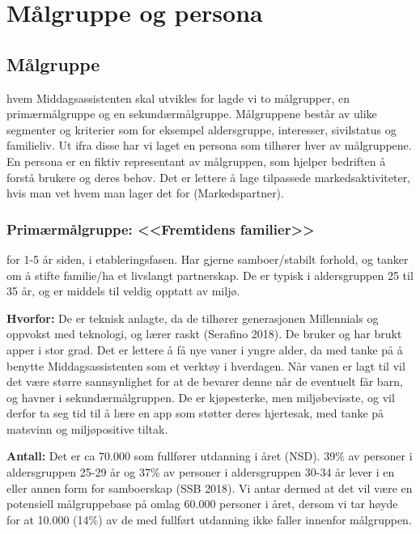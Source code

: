 \chapter{Målgruppe og persona}

\section{\textbf{Målgruppe}}
 hvem Middagsassistenten skal utvikles for lagde vi to målgrupper, en primærmålgruppe og en sekundærmålgruppe. Målgruppene består av ulike segmenter og kriterier som for eksempel aldersgruppe, interesser, sivilstatus og familieliv. Ut ifra disse har vi laget en persona som tilhører hver av målgruppene. En persona er en fiktiv representant av målgruppen, som hjelper bedriften å forstå brukere og deres behov. Det er lettere å lage tilpassede markedsaktiviteter, hvis man vet hvem man lager det for (Markedspartner).

\subsection{\textbf{Primærmålgruppe: <<Fremtidens familier>>}}
 for 1-5 år siden, i etableringsfasen. Har gjerne samboer/stabilt forhold, og tanker om å stifte familie/ha et livslangt partnerskap. De er typisk i aldersgruppen 25 til 35 år, og er middels til veldig opptatt av miljø.

\textbf{Hvorfor:} De er teknisk anlagte, da de tilhører generasjonen Millennials og oppvokst med teknologi, og lærer raskt (Serafino 2018). De bruker og har brukt apper i stor grad. Det er lettere å få nye vaner i yngre alder, da med tanke på å benytte Middagsassistenten som et verktøy i hverdagen. Når vanen er lagt til vil det være større sannsynlighet for at de bevarer denne når de eventuelt får barn, og havner i sekundærmålgruppen. De er kjøpesterke, men miljøbevisste, og vil derfor ta seg tid til å lære en app som støtter deres hjertesak, med tanke på matsvinn og miljøpositive tiltak. 

\textbf{Antall:} Det er ca 70.000 som fullfører utdanning i året (NSD). 39\% av personer i aldersgruppen 25-29 år og 37\% av personer i aldersgruppen 30-34 år lever i en eller annen form for samboerskap (SSB 2018). Vi antar dermed at det vil være en potensiell målgruppebase på omlag 60.000 personer i året, dersom vi tar høyde for at 10.000 (14\%) av de med fullført utdanning ikke faller innenfor målgruppen. 

